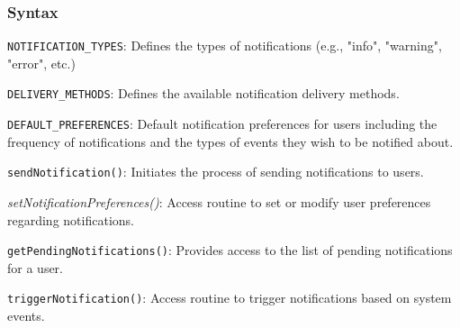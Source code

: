 \documentclass[12pt, titlepage]{article}
\begin{document}
\subsubsection{Syntax}
\begin{description}
  \item[Exported Constants:] 
  \item \texttt{NOTIFICATION\_TYPES}: Defines the types of notifications (e.g., "info", "warning", "error", etc.)
  \item \texttt{DELIVERY\_METHODS}: Defines the available notification delivery methods.
  \item \texttt{DEFAULT\_PREFERENCES}: Default notification preferences for users including the 
  frequency of notifications and the types of events they wish to be notified about.
  \item 
  \item[Exported Access Programs:] 
  \item \texttt{sendNotification()}: Initiates the process of sending notifications to users.
  \item \textsl{setNotificationPreferences()}: Access routine to set or modify user preferences
  regarding notifications.
  \item \texttt{getPendingNotifications()}: Provides access to the list of pending notifications 
  for a user.
  \item \texttt{triggerNotification()}: Access routine to trigger notifications based on system 
  events.
  \item
\end{description}
\end{document}
